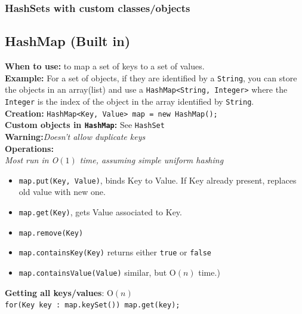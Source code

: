 \documentclass[a4paper,10pt]{article}
\begin{document}
\begin{multicols}{2}
\subsubsection{HashSets with custom classes/objects}

\subsection{HashMap (Built in)}\label{sec:HashMap}
\textbf{When to use:} to map a set of keys to a set of values.\\
\textbf{Example:} For a set of objects, if they are identified by a \lstinline|String|, you can store the objects in an array(list) and use a \lstinline|HashMap<String, Integer>| where the \lstinline|Integer| is the index of the object in the array identified by \lstinline|String|.\\
\textbf{Creation:} \lstinline|HashMap<Key, Value> map = new HashMap();|\\
\textbf{Custom objects in \lstinline|HashMap|:} See \lstinline|HashSet|\\
\textbf{Warning:}\textit{Doesn't allow duplicate keys}\\
\textbf{Operations:}\\
\textit{Most run in O$(1)$ time, assuming simple uniform hashing}
\begin{itemize}[nolistsep,noitemsep]
\itemsep0em
\item \lstinline|map.put(Key, Value)|, binds Key to Value. If Key already present, replaces old value with new one.
\item \lstinline|map.get(Key)|, gets Value associated to Key.
\item \lstinline|map.remove(Key)|
\item \lstinline|map.containsKey(Key)| returns either \lstinline|true| or \lstinline|false|
\item \lstinline|map.containsValue(Value)| similar, but O$(n)$ time.)
\end{itemize}
\textbf{Getting all keys/values}: O$(n)$\\\lstinline|for(Key key : map.keySet()) map.get(key);|
 

\end{multicols}
\end{document}

